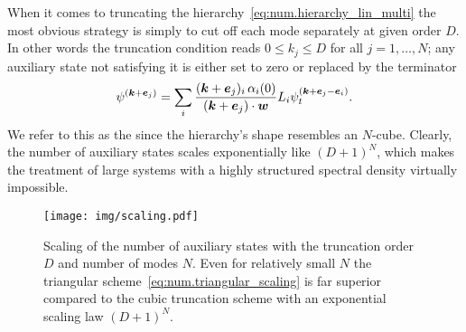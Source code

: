 When it comes to truncating the hierarchy~\ref{eq:num.hierarchy_lin_multi} the most obvious strategy is simply to cut off each mode separately at given order $D$.
In other words the truncation condition reads $0 \le k_j \le D$ for all $j=1,\dots,N$; any auxiliary state not satisfying it is either set to zero or replaced by the terminator
\begin{equation*}
  \psi^{(\boldsymbol{k}+\boldsymbol{e}_j)}
  = \sum_i  \frac{(\boldsymbol{k} + \boldsymbol{e}_j)_i \, \alpha_i(0)}{(\boldsymbol{k}+\boldsymbol{e}_j)\cdot\boldsymbol{w}} L_i \psi^{(\boldsymbol{k} +\boldsymbol{e}_j - \boldsymbol{e}_i)}_t.
\end{equation*}
We refer to this as the  since the hierarchy's shape resembles an $N$-cube. %
Clearly, the number of auxiliary states scales exponentially like $(D+1)^N$, which makes the treatment of large systems with a highly structured spectral density virtually impossible.

\begin{figure}
  \centering
  \texttt{[image: img/scaling.pdf]}
  \caption{%
    Scaling of the number of auxiliary states with the truncation order $D$ and number of modes $N$.
    Even for relatively small $N$ the triangular scheme~\ref{eq:num.triangular_scaling} is far superior compared to the cubic truncation scheme with an exponential scaling law $(D+1)^N$.
  }
  \label{fig:num.scaling}
\end{figure}

